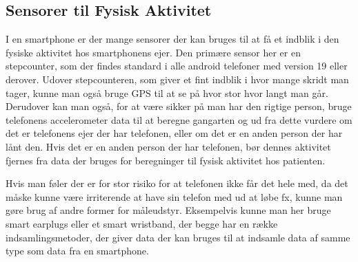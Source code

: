\subsection{Sensorer til Fysisk Aktivitet}
I en smartphone er der mange sensorer der kan bruges til at få et indblik i den fysiske aktivitet hos smartphonens ejer.
Den primære sensor her er en stepcounter, som der findes standard i alle android telefoner med version 19 eller derover.
Udover stepcounteren, som giver et fint indblik i hvor mange skridt man tager, kunne man også bruge GPS til at se på hvor stor hvor langt man går.
Derudover kan man også, for at være sikker på man har den rigtige person, bruge telefonens accelerometer data til at beregne gangarten og ud fra dette vurdere om det er telefonens ejer der har telefonen, eller om det er en anden person der har lånt den.
Hvis det er en anden person der har telefonen, bør dennes aktivitet fjernes fra data der bruges for beregninger til fysisk aktivitet hos patienten.

Hvis man føler der er for stor risiko for at telefonen ikke får det hele med, da det måske kunne være irriterende at have sin telefon med ud at løbe fx, kunne man gøre brug af andre former for måleudstyr.
Eksempelvis kunne man her bruge smart earplugs eller et smart wristband, der begge har en række indsamlingsmetoder, der giver data der kan bruges til at indsamle data af samme type som data fra en smartphone.